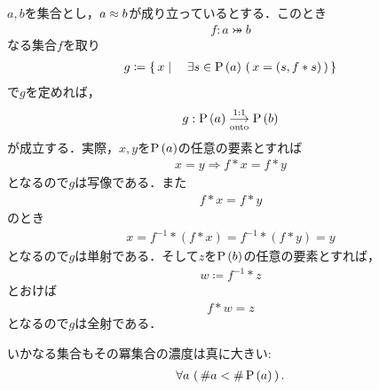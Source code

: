 	\begin{sketch}
		$a,b$を集合とし，$a \approx b$が成り立っているとする．このとき
		\begin{align}
			f:a \bij b
		\end{align}
		なる集合$f$を取り
		\begin{align}
			g \coloneqq \left\{\, x \mid \quad \exists s \in \operatorname*{P} \left(a\right)\, \left(\, x=(s,f \ast s)\, \right)\, \right\}
		\end{align}
		で$g$を定めれば，
		\begin{align}
			g:\operatorname*{P} \left(a\right) \underset{\mathrm{onto}}{\overset{\mathrm{1:1}}{\longrightarrow}} \operatorname*{P} \left(b\right)
		\end{align}
		が成立する．実際，$x,y$を$\operatorname*{P} \left(a\right)$の任意の要素とすれば
		\begin{align}
			x=y \Longrightarrow f \ast x = f \ast y
		\end{align}
		となるので$g$は写像である．また
		\begin{align}
			f \ast x = f \ast y
		\end{align}
		のとき
		\begin{align}
			x = f^{-1} \ast \left(f \ast x\right)
			= f^{-1} \ast \left(f \ast y\right)
			= y
		\end{align}
		となるので$g$は単射である．そして$z$を$\operatorname*{P} \left(b\right)$の任意の要素とすれば，
		\begin{align}
			w \coloneqq f^{-1} \ast z
		\end{align}
		とおけば
		\begin{align}
			f \ast w = z
		\end{align}
		となるので$g$は全射である．
		\QED
	\end{sketch}
	
	\begin{screen}
		\begin{thm}[Cantorの定理]
			いかなる集合もその冪集合の濃度は真に大きい:
			\begin{align}
				\forall a\, \left(\, \# a < \# \operatorname*{P} \left(a\right)\, \right).
			\end{align}
		\end{thm}
	\end{screen}
	
